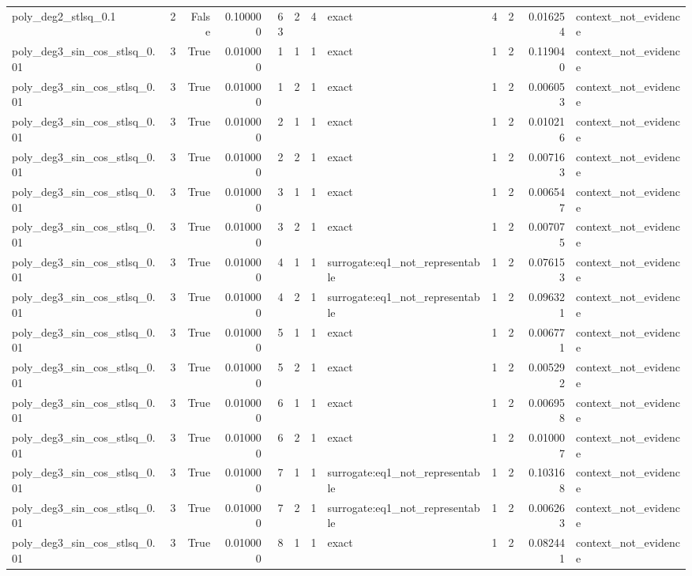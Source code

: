 \begin{tabular}{lrrrrrrlrrrl}
poly\_deg2\_stlsq\_0.1 & 2 & False & 0.100000 & 63 & 2 & 4 & exact & 4 & 2 & 0.016254 & context\_not\_evidence \\
poly\_deg3\_sin\_cos\_stlsq\_0.01 & 3 & True & 0.010000 & 1 & 1 & 1 & exact & 1 & 2 & 0.119040 & context\_not\_evidence \\
poly\_deg3\_sin\_cos\_stlsq\_0.01 & 3 & True & 0.010000 & 1 & 2 & 1 & exact & 1 & 2 & 0.006053 & context\_not\_evidence \\
poly\_deg3\_sin\_cos\_stlsq\_0.01 & 3 & True & 0.010000 & 2 & 1 & 1 & exact & 1 & 2 & 0.010216 & context\_not\_evidence \\
poly\_deg3\_sin\_cos\_stlsq\_0.01 & 3 & True & 0.010000 & 2 & 2 & 1 & exact & 1 & 2 & 0.007163 & context\_not\_evidence \\
poly\_deg3\_sin\_cos\_stlsq\_0.01 & 3 & True & 0.010000 & 3 & 1 & 1 & exact & 1 & 2 & 0.006547 & context\_not\_evidence \\
poly\_deg3\_sin\_cos\_stlsq\_0.01 & 3 & True & 0.010000 & 3 & 2 & 1 & exact & 1 & 2 & 0.007075 & context\_not\_evidence \\
poly\_deg3\_sin\_cos\_stlsq\_0.01 & 3 & True & 0.010000 & 4 & 1 & 1 & surrogate:eq1\_not\_representable & 1 & 2 & 0.076153 & context\_not\_evidence \\
poly\_deg3\_sin\_cos\_stlsq\_0.01 & 3 & True & 0.010000 & 4 & 2 & 1 & surrogate:eq1\_not\_representable & 1 & 2 & 0.096321 & context\_not\_evidence \\
poly\_deg3\_sin\_cos\_stlsq\_0.01 & 3 & True & 0.010000 & 5 & 1 & 1 & exact & 1 & 2 & 0.006771 & context\_not\_evidence \\
poly\_deg3\_sin\_cos\_stlsq\_0.01 & 3 & True & 0.010000 & 5 & 2 & 1 & exact & 1 & 2 & 0.005292 & context\_not\_evidence \\
poly\_deg3\_sin\_cos\_stlsq\_0.01 & 3 & True & 0.010000 & 6 & 1 & 1 & exact & 1 & 2 & 0.006958 & context\_not\_evidence \\
poly\_deg3\_sin\_cos\_stlsq\_0.01 & 3 & True & 0.010000 & 6 & 2 & 1 & exact & 1 & 2 & 0.010007 & context\_not\_evidence \\
poly\_deg3\_sin\_cos\_stlsq\_0.01 & 3 & True & 0.010000 & 7 & 1 & 1 & surrogate:eq1\_not\_representable & 1 & 2 & 0.103168 & context\_not\_evidence \\
poly\_deg3\_sin\_cos\_stlsq\_0.01 & 3 & True & 0.010000 & 7 & 2 & 1 & surrogate:eq1\_not\_representable & 1 & 2 & 0.006263 & context\_not\_evidence \\
poly\_deg3\_sin\_cos\_stlsq\_0.01 & 3 & True & 0.010000 & 8 & 1 & 1 & exact & 1 & 2 & 0.082441 & context\_not\_evidence \\

\end{tabular}
